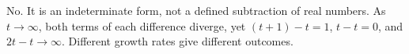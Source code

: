 No. It is an indeterminate form, not a defined subtraction of real numbers. As $t\to\infty$, both terms of each difference diverge, yet $(t+1)-t=1$, $t-t=0$, and $2t-t\to\infty$. Different growth rates give different outcomes.
